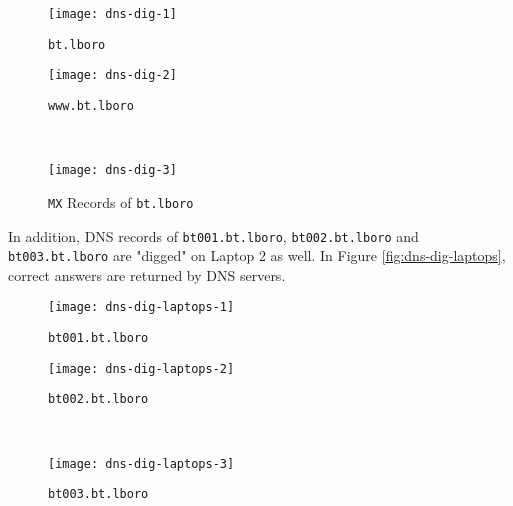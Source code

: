 \begin{figure*}[ht!]
    \centering
    \begin{subfigure}[b]{0.67\textwidth}
        \centering
        \texttt{[image: dns-dig-1]}
        \caption{\texttt{bt.lboro}}
    \end{subfigure}
    \hfill
    \begin{minipage}[b]{0.3\textwidth}
	    \begin{subfigure}[b]{\linewidth}
	        \centering
	        \texttt{[image: dns-dig-2]}
	        \caption{\texttt{www.bt.lboro}}
	    \end{subfigure}
	    \\
	    \begin{subfigure}[b]{\linewidth}
	        \centering
	        \texttt{[image: dns-dig-3]}
	        \caption{\texttt{MX} Records of \texttt{bt.lboro}}
	    \end{subfigure}
	\end{minipage}
    \caption{Querying DNS Records for \texttt{bt.lboro} and \texttt{www.bt.lboro} on Laptop 2.}
    \label{fig:dns-dig}
\end{figure*}

In addition, DNS records of \texttt{bt001.bt.lboro}, \texttt{bt002.bt.lboro} and \texttt{bt003.bt.lboro} are "digged" on Laptop 2 as well. In Figure \ref{fig:dns-dig-laptops}, correct answers are returned by DNS servers.


\begin{figure*}[ht!]
    \centering
    \begin{subfigure}[b]{0.67\textwidth}
        \centering
        \texttt{[image: dns-dig-laptops-1]}
        \caption{\texttt{bt001.bt.lboro}}
    \end{subfigure}
    \hfill
    \begin{minipage}[b]{0.3\textwidth}
	    \begin{subfigure}[b]{\linewidth}
	        \centering
	        \texttt{[image: dns-dig-laptops-2]}
	        \caption{\texttt{bt002.bt.lboro}}
	    \end{subfigure}
	    \\
	    \begin{subfigure}[b]{\linewidth}
	        \centering
	        \texttt{[image: dns-dig-laptops-3]}
	        \caption{\texttt{bt003.bt.lboro}}
	    \end{subfigure}
	\end{minipage}
    \caption{Querying DNS Records for sub-domains of \texttt{bt.lboro} on Laptop 2.}
    \label{fig:dns-dig-laptops}
\end{figure*}



